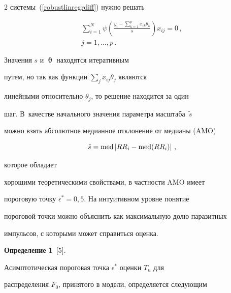 \begin{multicols}{2}
системы~(\ref{robustlinregrdiff}) нужно решать


\begin{multline}


\label{robustlinregrdiffscale}


\sum_{i=1}^N\psi\left(\frac{y_i-\sum_{k=1}^p


x_{ik}\theta_k}{s}\right)x_{ij}=0\,, \\


 j=1,\ldots,p\,.


\end{multline}


Значения $s$ и $\bm\uptheta$ находятся итеративным


путем, но так как функции $\sum\limits_j x_{ij}\theta_j$ являются


линейными относительно $\theta_j$, то решение находится за один


шаг. В~качестве начального значения параметра масштаба~$\tilde{s}$


можно взять абсолютное медианное отклонение от медианы (AMO)


\begin{equation*}




\tilde{s} =


\med\left|RR_i-\med(RR_i)\right|\,,


\end{equation*}


которое обладает


хорошими теоретическими свойствами, в частности AMO имеет


пороговую точку $\epsilon^*=0{,}5$. На интуитивном уровне понятие


пороговой точки можно объяснить как максимальную долю паразитных


импульсов, с которыми может справиться оценка.





\medskip





\noindent


{\bf Определение 1}~[5]. %


 {\it


Асимптотическая пороговая точка $\epsilon^*$ оценки $T_n$ для


распределения $F_0$, принятого в модели, определяется следующим


}
\end{multicols}
